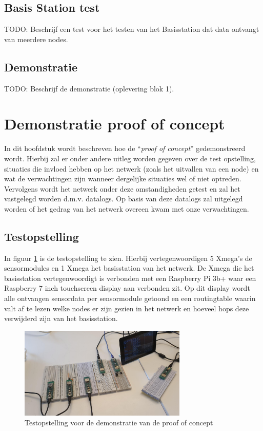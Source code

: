 \documentclass[a4paper, 11pt]{article}
\begin{document}
\subsection{Basis Station test}
TODO: Beschrijf een test voor het testen van het Basisstation dat data ontvangt van meerdere nodes.
\subsection{Demonstratie}
TODO: Beschrijf de demonstratie (oplevering blok 1).

\section{Demonstratie proof of concept} \label{demonstratie}
In dit hoofdstuk wordt beschreven hoe de ``\textit{proof of concept}'' gedemonstreerd wordt. Hierbij zal er onder andere uitleg worden gegeven over de test opstelling, situaties die invloed hebben op het netwerk (zoals het uitvallen van een node) en wat de verwachtingen zijn wanneer dergelijke situaties wel of niet optreden. Vervolgens wordt het netwerk onder deze omstandigheden getest en zal het vastgelegd worden d.m.v. datalogs. Op basis van deze datalogs zal uitgelegd worden of het gedrag van het netwerk overeen kwam met onze verwachtingen.
\newpage
\subsection{Testopstelling} \label{Testopstelling}
In figuur \ref{testopstelling} is de testopstelling te zien. Hierbij vertegenwoordigen 5 Xmega's de sensormodules en 1 Xmega het basisstation van het netwerk. De Xmega die het basisstation vertegenwoordigt is verbonden met een Raspberry Pi 3b+  waar een Raspberry 7 inch touchscreen display aan verbonden zit. Op dit display wordt alle ontvangen sensordata per sensormodule getoond en een routingtable waarin valt af te lezen welke nodes er zijn gezien in het netwerk en hoeveel hops deze verwijderd zijn van het basisstation.
\begin{figure}[h!]
	\centering
	\includegraphics[width=8cm]{media/TestOpstellingNetwerk.jpeg}
	\caption{Testopstelling voor de demonstratie van de proof of concept} \label{testopstelling}
\end{figure}
\end{document}
